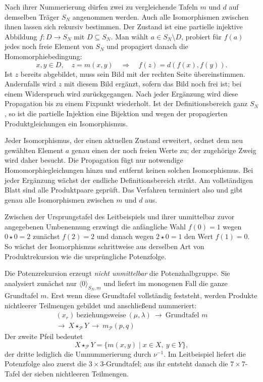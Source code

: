 \documentclass[main.tex]{subfiles}
\begin{document}
Nach ihrer Nummerierung dürfen zwei zu vergleichende Tafeln \(m\) und \(d\)
auf demselben Träger \(S_N\) angenommen werden.  Auch alle Isomorphismen
zwischen ihnen lassen sich rekursiv bestimmen.  Der Zustand ist eine
partielle injektive Abbildung \(f\colon D\to S_N\) mit
\(D\subseteq S_N\).  Man wählt \(a\in S_N\setminus D\), probiert für \(f(a)\)
jedes noch freie Element von \(S_N\) und propagiert danach die
Homomorphiebedingung:
\[
  x,y\in D,\quad z=m(x,y)
  \quad\Longrightarrow\quad
  f(z)=d(f(x),f(y)).
\]
Ist \(z\) bereits abgebildet, muss sein Bild mit der rechten Seite
übereinstimmen.  Andernfalls wird \(z\) mit diesem Bild ergänzt, sofern das
Bild noch frei ist; bei einem Widerspruch wird zurückgegangen.  Nach jeder
Ergänzung wird diese Propagation bis zu einem Fixpunkt wiederholt.  Ist der
Definitionsbereich ganz \(S_N\), so ist die partielle Injektion eine
Bijektion und wegen der propagierten Produktgleichungen ein Isomorphismus.

Jeder Isomorphismus, der einen aktuellen Zustand erweitert, ordnet dem neu
gewählten Element \(a\) genau einen der noch freien Werte zu; der zugehörige
Zweig wird daher besucht.  Die Propagation fügt nur notwendige
Homomorphiegleichungen hinzu und entfernt keinen solchen Isomorphismus.  Bei
jeder Ergänzung wächst der endliche Definitionsbereich strikt.  Am
vollständigen Blatt sind alle Produktpaare geprüft.  Das Verfahren terminiert
also und gibt genau alle Isomorphismen zwischen \(m\) und \(d\) aus.

Zwischen der Ursprungstafel des Leitbeispiels und ihrer unmittelbar zuvor
angegebenen Umbenennung erzwingt die anfängliche Wahl \(f(0)=1\) wegen
\(0\star0=2\) zunächst \(f(2)=2\) und danach wegen \(2\star0=1\) den Wert
\(f(1)=0\).  So wächst der Isomorphismus schrittweise aus derselben Art von
Produktrekursion wie die ursprüngliche Potenzfolge.

\begin{remark}
Die Potenzrekursion erzeugt \emph{nicht unmittelbar} die Potenzhalbgruppe.
Sie analysiert zunächst nur \(\langle0\rangle_{S_N,m}\) und liefert im monogenen Fall
die ganze Grundtafel \(m\).  Erst wenn diese Grundtafel vollständig feststeht,
werden Produkte nichtleerer Teilmengen gebildet und anschließend nummeriert:
\[
\boxed{
\begin{gathered}
  (x_r)\ \text{beziehungsweise}\ (\mu,\lambda)
  \ \longrightarrow\ \text{Grundtafel }m\\
  \longrightarrow\ X\star_{\mathcal P}Y
  \ \longrightarrow\ m_{\mathcal P}(p,q)
\end{gathered}
}
\]
Der zweite Pfeil bedeutet
\[
  X\star_{\mathcal P}Y
  =
  \{m(x,y)\mid x\in X,\ y\in Y\},
\]
der dritte lediglich die Umnummerierung durch \(\nu^{-1}\).  Im Leitbeispiel
liefert die Potenzfolge also zuerst die \(3\times3\)-Grundtafel; aus ihr
entsteht danach die \(7\times7\)-Tafel der sieben nichtleeren Teilmengen.
\end{remark}


\end{document}
